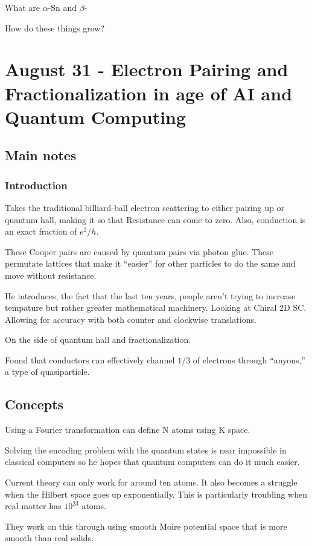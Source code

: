 What are $\alpha$-Sn and $\beta$-

How do these things grow?



\section{August 31 - Electron Pairing and Fractionalization in age of AI and Quantum Computing}
\subsection{Main notes}
\subsubsection{Introduction}

Takes the traditional billiard-ball electron scattering to either pairing up or quantum hall, making it so that Resistance can come to zero. Also, conduction is an exact fraction of $e^2/h$.

These Cooper pairs are caused by quantum pairs via photon glue. These permutate lattices that make it ``easier'' for other particles to do the same and move without resistance.

He introduces, the fact that the last ten years, people aren't trying to increase tempature but rather greater mathematical machinery. Looking at Chiral 2D SC. Allowing for accuracy with both counter and clockwise translations.

On the side of quantum hall and fractionalization.

Found that conductors can effectively channel $1/3$ of electrons through ``anyons,'' a type of quasiparticle.

\subsection{Concepts}

Using a Fourier transformation can define N atoms using K space.

Solving the encoding problem with the quantum states is near impossible in classical computers so he hopes that quantum computers can do it much easier.

Current theory can only work for around ten atoms. It also becomes a struggle when the Hilbert space goes up exponentially. This is particularly troubling when real matter has $10^{23}$ atoms.

They work on this through using smooth Moire potential space that is more smooth than real solids.

